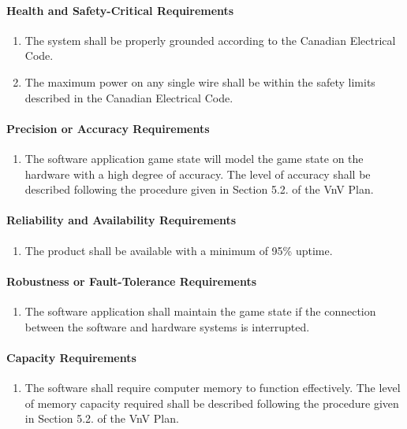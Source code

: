 \documentclass[12pt]{article}
\begin{document}
\paragraph{Health and Safety-Critical Requirements}
\begin{enumerate}[{PR}1., leftmargin=2\parindent, resume]
    \item The system shall be properly grounded according to the Canadian Electrical Code. \cite{CanadianElectricalCode2021}
    \item The maximum power on any single wire shall be within the safety limits described in the Canadian Electrical Code.
\end{enumerate}

\paragraph{Precision or Accuracy Requirements}
\begin{enumerate}[{PR}1., leftmargin=2\parindent, resume]
    \item The software application game state will model the game state on the \progname{} hardware with a high degree of accuracy. 
    The level of accuracy shall be described following the procedure given in Section 5.2.\thevnvSectionNfr{}
    of the VnV Plan.
\end{enumerate}

\paragraph{Reliability and Availability Requirements}
\begin{enumerate}[{PR}1., leftmargin=2\parindent, resume]
    \item The product shall be available with a minimum of 95\% uptime. 
\end{enumerate}

\paragraph{Robustness or Fault-Tolerance Requirements}
\begin{enumerate}[{PR}1., leftmargin=2\parindent, resume]
    \item The software application shall maintain the game state if the connection between the software and hardware systems is interrupted.
\end{enumerate}

\paragraph{Capacity Requirements}
\begin{enumerate}[{PR}1., leftmargin=2\parindent, resume]
    \item The software shall require computer memory to function effectively. The level of memory capacity required shall be described following
    the procedure given in Section 5.2.\thevnvSectionNfr{} of the VnV Plan.
\end{enumerate}
\end{document}
